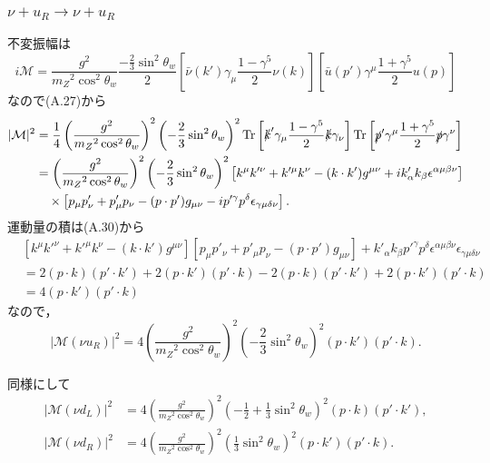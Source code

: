 \subsubsection{\(\nu + u_R \to \nu + u_R\)}
不変振幅は
\[
i\mathcal{M} = \frac{g^2}{m_Z{}^2\cos^2\theta_w} \frac{ - \frac{2}{3}\sin^2\theta_w}{2}
\left[\bar\nu(k') \gamma_\mu \frac{1-\gamma^5}{2} \nu(k) \right]
\left[\bar{u}(p') \gamma^\mu \frac{1+\gamma^5}{2} u(p) \right]
\]
なので(A.27)から
\begin{align*}
  \lvert\mathcal{M}\rvert^2
  &= \frac{1}{4} \left(\frac{g^2}{m_Z{}^2\cos^2\theta_w}\right)^2
  \left( - \frac{2}{3}\sin^2\theta_w\right)^2
  \operatorname{Tr} \left[ \slashed{k}' \gamma_\mu \frac{1-\gamma^5}{2} \slashed{k} \gamma_\nu \right]
  \operatorname{Tr} \left[ \slashed{p}' \gamma^\mu \frac{1+\gamma^5}{2} \slashed{p} \gamma^\nu \right] \\
  &= \left(\frac{g^2}{m_Z{}^2\cos^2\theta_w}\right)^2
  \left( - \frac{2}{3}\sin^2\theta_w\right)^2
  \left[ k^\mu k'^\nu + k'^\mu k^\nu - (k\cdot k') g^{\mu\nu} + ik'_\alpha k_\beta \epsilon^{\alpha\mu\beta\nu} \right] \\
  &\quad\times \left[ p_\mu p'_\nu + p'_\mu p_\nu - (p\cdot p') g_{\mu\nu} - ip'^\gamma p^\delta \epsilon_{\gamma\mu\delta\nu} \right] .
\end{align*}
運動量の積は(A.30)から
\begin{align*}
  & [k^\mu k'^\nu + k'^\mu k^\nu - (k\cdot k') g^{\mu\nu}]
  [p_\mu p'_\nu + p'_\mu p_\nu - (p\cdot p') g_{\mu\nu}]
  + k'_\alpha k_\beta p'^\gamma p^\delta \epsilon^{\alpha\mu\beta\nu}\epsilon_{\gamma\mu\delta\nu} \\
  &= 2 (p\cdot k)(p'\cdot k') + 2 (p\cdot k')(p'\cdot k) - 2 (p\cdot k)(p'\cdot k') + 2 (p\cdot k')(p'\cdot k) \\
  &= 4 (p\cdot k')(p'\cdot k)
\end{align*}
なので，
\[
\lvert\mathcal{M}(\nu u_R)\rvert^2
= 4 \left(\frac{g^2}{m_Z{}^2\cos^2\theta_w}\right)^2
\left( - \frac{2}{3}\sin^2\theta_w\right)^2
(p\cdot k')(p'\cdot k) .
\]

同様にして
\begin{align*}
  \lvert\mathcal{M}(\nu d_L)\rvert^2
  &= 4 \left(\frac{g^2}{m_Z{}^2\cos^2\theta_w}\right)^2
  \left(-\frac{1}{2} + \frac{1}{3}\sin^2\theta_w\right)^2
  (p\cdot k)(p'\cdot k') , \\
  \lvert\mathcal{M}(\nu d_R)\rvert^2
  &= 4 \left(\frac{g^2}{m_Z{}^2\cos^2\theta_w}\right)^2
  \left(\frac{1}{3}\sin^2\theta_w\right)^2
  (p\cdot k')(p'\cdot k) .
\end{align*}

